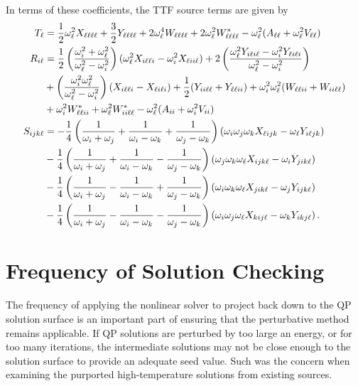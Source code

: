 \documentclass[../PhD.tex]{subfiles}
\begin{document}
\begin{subappendices}
In terms of these coefficients, the TTF source terms are given by
\begin{align}
\label{T calc}
T_\ell &= \frac{1}{2} \omega_\ell^2 X_{\ell\ell\ell\ell} + \frac{3}{2} Y_{\ell\ell\ell\ell} + 2\omega_\ell^4 W_{\ell\ell\ell\ell} + 2\omega_\ell^2 W^*_{\ell\ell\ell\ell} - \omega_\ell^2 (A_{\ell\ell} + \omega_\ell^2 V_{\ell\ell} ) \\
\label{R calc}
R_{i\ell} &=\frac{1}{2} \left(\frac{\omega_i^2 + \omega_\ell^2}{\omega_\ell^2 - \omega_i^2}\right) (\omega_\ell^2 X_{i\ell\ell i} - \omega_i^2 X_{\ell ii\ell}) + 2\left(\frac{\omega_\ell^2 Y_{i\ell i\ell } - \omega_i^2 Y_{\ell i\ell i}}{\omega_\ell^2 - \omega_i^2} \right) \nonumber \\
&+ \left(\frac{\omega_i^2 \omega_\ell^2}{\omega_\ell^2 - \omega_i^2}\right) (X_{i\ell \ell i} - X_{\ell i\ell i}) + \frac{1}{2} (Y_{ii\ell \ell } + Y_{\ell \ell ii}) + \omega_i^2 \omega_\ell^2 (W_{\ell \ell ii} + W_{ii\ell \ell }) \nonumber \\
&+ \omega_i^2 W^*_{\ell \ell ii} + \omega_\ell^2 W^*_{ii\ell \ell } - \omega_\ell^2 (A_{ii} + \omega_i^2 V_{ii} ) \\
\label{S calc}
S_{ijk\ell } &= -\frac{1}{4} \left( \frac{1}{\omega_i + \omega_j} + \frac{1}{\omega_i - \omega_k} + \frac{1}{\omega_j - \omega_k} \right) (\omega_i \omega_j \omega_k X_{\ell ijk} - \omega_\ell  Y_{i\ell jk}) \nonumber \\
& - \frac{1}{4} \left( \frac{1}{\omega_i + \omega_j} +\frac{1}{\omega_i - \omega_k} - \frac{1}{\omega_j - \omega_k} \right) (\omega_j \omega_k \omega_\ell X_{ijk\ell } - \omega_i Y_{jik\ell } ) \nonumber \\
& -\frac{1}{4} \left( \frac{1}{\omega_i + \omega_j} - \frac{1}{\omega_i - \omega_k} + \frac{1}{\omega_j -\omega_k} \right) (\omega_i \omega_k \omega_\ell X_{jik\ell } - \omega_j Y_{ijk\ell } ) \nonumber \\
& -\frac{1}{4} \left( \frac{1}{\omega_i + \omega_j} - \frac{1}{\omega_i - \omega_k} - \frac{1}{\omega_j - \omega_k} \right) (\omega_i \omega_j \omega_\ell X_{kij\ell } - \omega_k Y_{ikj\ell }) \, .
\end{align}




\section{Frequency of Solution Checking}
\label{app: reop freq}

The frequency of applying the nonlinear solver to project back down to the QP solution surface is an important part of ensuring that the perturbative method remains applicable. If QP solutions are perturbed by too large an energy, or for too many iterations, the intermediate solutions may not be close enough to the solution surface to provide an adequate seed value. Such was the concern when examining the purported high-temperature solutions from existing sources.


\end{subappendices}
\end{document}
